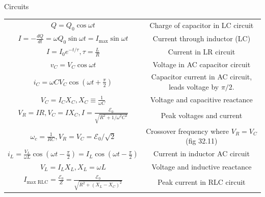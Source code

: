\documentclass{article}
\begin{document}
\begin{center}
\begin{section}{Circuits}
\begin{tabular}{|c|c|}
		 $Q = Q_0 \cos \omega t$                                                        & Charge of capacitor in LC circuit                 \\

		 $I = - \frac{dQ}{dt} = \omega Q_0 \sin \omega t = I_\text{max} \sin \omega t$  & Current through inductor (LC)                     \\

		 $I = I_0 e^{-t / \tau}, \tau = \frac{L}{R}$                                    & Current in LR circuit                             \\

		 $v_C = V_C \cos \omega t$                                                      & Voltage in AC capacitor circuit                   \\

		 $i_C = \omega C V_C \cos \left(\omega t + \frac{\pi}{2} \right)$               & \makecell{Capacitor current in AC circuit, leads  \\
		 voltage by $\pi/2$.}                                                                                                               \\

		 $V_C = I_C X_C, X_C \equiv \frac{1}{\omega C}$                                 & Voltage and capacitive reactance                  \\

		 $V_R = IR, V_C = I X_C, I = \frac{\mathcal E_0}{\sqrt{ R^2 + 1/\omega^2 C^2}}$ & Peak voltages and current                         \\

		 $\omega_c = \frac{1}{RC}, V_R = V_C = \mathcal E_0 / \sqrt{2}$                 & Crossover frequency where $V_R = V_C$ (fig 32.11) \\

		 $i_L = \frac{V_L}{\omega L} \cos \left(\omega t - \frac{\pi}{2} \right)
		 = I_L  \cos \left(\omega t - \frac{\pi}{2} \right) $                           & Current in inductor AC circuit                    \\

		 $V_L = I_L X_L, X_L = \omega L$                                                & Voltage and inductive reactance                   \\

		 $I_\text{max RLC} = \frac{\mathcal E_0}{Z}
		 = \frac{\mathcal E_0}{\sqrt{R^2 + (X_L - X_C)^2}}$                             & Peak current in RLC circuit                       \\


\end{tabular}
\end{section}
\end{center}
\end{document}
